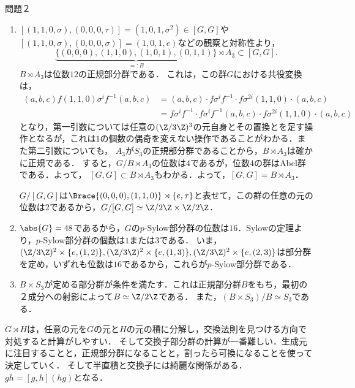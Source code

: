 \documentclass[uplatex,dvipdfmx]{jsreport}
\begin{document}
問題２
\begin{enumerate}
    \item $[(1,1,0,\sigma),(0,0,0,\tau)]=(1,0,1,\sigma^2)\in[G,G]$や$[(1,1,0,\sigma),(0,0,0,\sigma)]=(1,0,1,e)$などの観察と対称性より，
    \[\underbrace{\{(0,0,0),(1,1,0),(1,0,1),(0,1,1)\}}_{=:B}\rtimes A_3\subset[G,G].\]
    $B\rtimes A_3$は位数$12$の正規部分群である．
    これは，この群$G$における共役変換は，
    \begin{align*}
        (a,b,c)f(1,1,0)\sigma^if^{-1}(a,b,c)&=(a,b,c)\cdot f\sigma^if^{-1}\cdot f\sigma^{2i}(1,1,0)\cdot(a,b,c)\\
        &=f\sigma^if^{-1}\cdot f\sigma^if^{-1}(a,b,c)\cdot f\sigma^{2i}(1,1,0)\cdot(a,b,c)
    \end{align*}
    となり，第一引数については任意の$(\Z/3\Z)^3$の元自身とその置換とを足す操作となるが，これは$1$の個数の偶奇を変えない操作であることがわかる．また第二引数についても，
    $A_3$が$S_3$の正規部分群であることから，$B\rtimes A_3$は確かに正規である．
    すると，$G/B\rtimes A_3$の位数は$4$であるが，位数$4$の群はAbel群である．よって，
    $[G,G]\subset B\rtimes A_3$もわかる．よって，$[G,G]=B\rtimes A_3$．

    $G/[G,G]$は$\Brace{(0,0,0),(1,1,0)}\rtimes\{e,\tau\}$と表せて，この群の任意の元の位数は$2$であるから，$G/[G,G]\simeq\Z/2\Z\times\Z/2\Z$．
    \item $\abs{G}=48$であるから，$G$の$p$-Sylow部分群の位数は$16$．Sylowの定理より，$p$-Sylow部分群の個数は$1$または$3$である．
    いま，$(\Z/3\Z)^2\times\{e,(1,2)\},(\Z/3\Z)^2\times\{e,(1,3)\},(\Z/3\Z)^2\times\{e,(2,3)\}$は部分群を定め，いずれも位数は$16$であるから，これらが$p$-Sylow部分群である．
    \item $B\times S_3$が定める部分群が条件を満たす．これは正規部分群$B$をもち，最初の２成分への射影によって$B\simeq\Z/2\Z$である．
    また，$(B\times S_3)/B\simeq S_3$である．
\end{enumerate}

\begin{remarks}[半直積の計算]
    $G\rtimes H$は，任意の元を$G$の元と$H$の元の積に分解し，交換法則を見つける方向で対処すると計算がしやすい．
    そして交換子部分群の計算が一番難しい．生成元に注目することと，正規部分群になることと，割ったら可換になることを使って決定していく．
    そして半直積と交換子には綺麗な関係がある．$gh=[g,h](hg)$となる．
\end{remarks}
\end{document}
